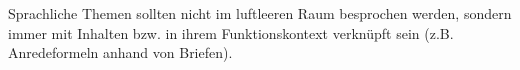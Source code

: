Sprachliche Themen sollten nicht im luftleeren Raum besprochen werden, sondern immer mit Inhalten bzw. in ihrem Funktionskontext verknüpft sein (z.B. Anredeformeln anhand von Briefen).
